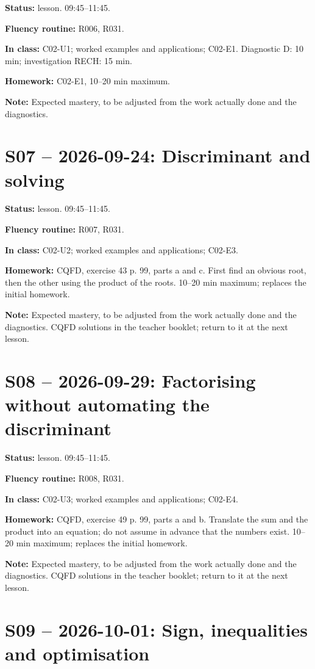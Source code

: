 \textbf{Status:} lesson. 09:45–11:45.\par\textbf{Fluency routine:} R006, R031.\par\textbf{In class:} C02-U1; worked examples and applications; C02-E1. Diagnostic D: 10 min; investigation RECH: 15 min.\par\textbf{Homework:} C02-E1, 10–20 min maximum.\par\textbf{Note:} Expected mastery, to be adjusted from the work actually done and the diagnostics.
\section*{S07 -- 2026-09-24: Discriminant and solving}
\textbf{Status:} lesson. 09:45–11:45.\par\textbf{Fluency routine:} R007, R031.\par\textbf{In class:} C02-U2; worked examples and applications; C02-E3. \par\textbf{Homework:} CQFD, exercise 43 p. 99, parts a and c. First find an obvious root, then the other using the product of the roots. 10–20 min maximum; replaces the initial homework.\par\textbf{Note:} Expected mastery, to be adjusted from the work actually done and the diagnostics. CQFD solutions in the teacher booklet; return to it at the next lesson.
\section*{S08 -- 2026-09-29: Factorising without automating the discriminant}
\textbf{Status:} lesson. 09:45–11:45.\par\textbf{Fluency routine:} R008, R031.\par\textbf{In class:} C02-U3; worked examples and applications; C02-E4. \par\textbf{Homework:} CQFD, exercise 49 p. 99, parts a and b. Translate the sum and the product into an equation; do not assume in advance that the numbers exist. 10–20 min maximum; replaces the initial homework.\par\textbf{Note:} Expected mastery, to be adjusted from the work actually done and the diagnostics. CQFD solutions in the teacher booklet; return to it at the next lesson.
\section*{S09 -- 2026-10-01: Sign, inequalities and optimisation}
